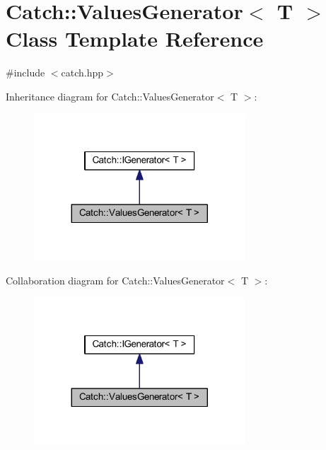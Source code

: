 \hypertarget{class_catch_1_1_values_generator}{}\section{Catch\+:\+:Values\+Generator$<$ T $>$ Class Template Reference}
\label{class_catch_1_1_values_generator}


{\ttfamily \#include $<$catch.\+hpp$>$}



Inheritance diagram for Catch\+:\+:Values\+Generator$<$ T $>$\+:\nopagebreak
\begin{figure}[H]
\begin{center}
\leavevmode
\includegraphics[width=224pt]{class_catch_1_1_values_generator__inherit__graph}
\end{center}
\end{figure}


Collaboration diagram for Catch\+:\+:Values\+Generator$<$ T $>$\+:\nopagebreak
\begin{figure}[H]
\begin{center}
\leavevmode
\includegraphics[width=224pt]{class_catch_1_1_values_generator__coll__graph}
\end{center}
\end{figure}
